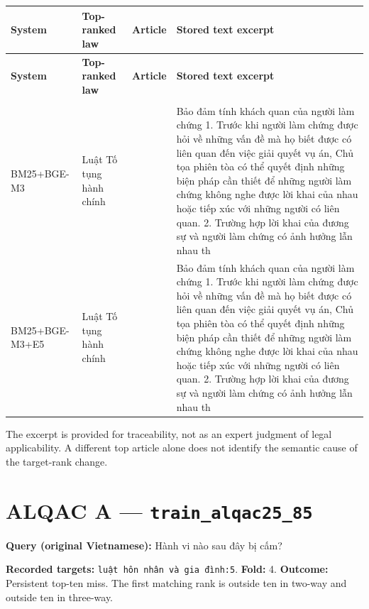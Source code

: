 \begingroup
\scriptsize
\setlength{\tabcolsep}{2pt}
\renewcommand{\arraystretch}{1.0}
\begin{longtable}{>{\raggedright\arraybackslash}p{1.948cm}>{\raggedright\arraybackslash}p{2.497cm}>{\raggedright\arraybackslash}p{1.822cm}>{\raggedright\arraybackslash}p{8.852cm}}
\toprule
\textbf{System} & \textbf{Top-ranked law} & \textbf{Article} & \textbf{Stored text excerpt} \\
\midrule
\endfirsthead
\toprule
\textbf{System} & \textbf{Top-ranked law} & \textbf{Article} & \textbf{Stored text excerpt} \\
\midrule
\endhead
\midrule
\multicolumn{4}{r}{\footnotesize Continued on next page}\\
\endfoot
\bottomrule
\endlastfoot
BM25+\allowbreak{}BGE-M3 & Luật Tố tụng hành chính & 171 & Bảo đảm tính khách quan của người làm chứng  1. Trước khi người làm chứng được hỏi về những vấn đề mà họ biết được có liên quan đến việc giải quyết vụ án, Chủ tọa phiên tòa có thể quyết định những biện pháp cần thiết để những người làm chứng không nghe được lời khai của nhau hoặc tiếp xúc với những người có liên quan.  2. Trường hợp lời khai của đương sự và người làm chứng có ảnh hưởng lẫn nhau th \\
BM25+\allowbreak{}BGE-M3+\allowbreak{}E5 & Luật Tố tụng hành chính & 171 & Bảo đảm tính khách quan của người làm chứng  1. Trước khi người làm chứng được hỏi về những vấn đề mà họ biết được có liên quan đến việc giải quyết vụ án, Chủ tọa phiên tòa có thể quyết định những biện pháp cần thiết để những người làm chứng không nghe được lời khai của nhau hoặc tiếp xúc với những người có liên quan.  2. Trường hợp lời khai của đương sự và người làm chứng có ảnh hưởng lẫn nhau th \\
\end{longtable}
\endgroup

The excerpt is provided for traceability, not as an expert judgment of legal applicability. A different top article alone does not identify the semantic cause of the target-rank change.

\section{ALQAC A — \texttt{train\_al\allowbreak{}qac25\_85}}

\textbf{Query (original Vietnamese):} Hành vi nào sau đây bị cấm?

\textbf{Recorded targets:} \texttt{luật hôn\allowbreak{} nhân và\allowbreak{} gia đìn\allowbreak{}h:5}. \textbf{Fold:} 4. \textbf{Outcome:} Persistent top-ten miss. The first matching rank is outside ten in two-way and outside ten in three-way.

